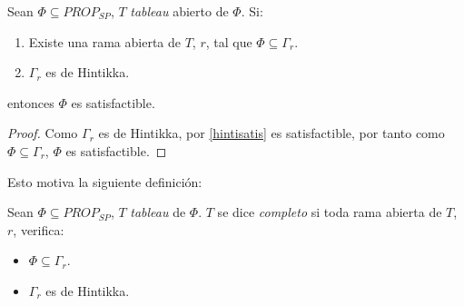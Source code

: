 \begin{cor}\label{hintitabli}
Sean $\Phi \subseteq PROP_{SP}$, $T$ \textit{tableau} abierto de $\Phi$. Si:
\begin{enumerate}
    \item Existe una rama abierta de $T$, $r$, tal que $\Phi \subseteq \Gamma_r$.
    \item $\Gamma_r$ es de Hintikka.
\end{enumerate}
entonces $\Phi$ es satisfactible.
\end{cor}

\begin{proof}
Como $\Gamma_r$ es de Hintikka, por \ref{hintisatis} es satisfactible, por tanto como $\Phi\subseteq\Gamma_r$, $\Phi$ es satisfactible.

\end{proof}



Esto motiva la siguiente definición:

\begin{definition}
Sean $\Phi \subseteq PROP_{SP}$, $T$ \textit{tableau} de $\Phi$. $T$ se dice \textit{completo} si toda rama abierta de $T$, $r$, verifica:
\begin{itemize}
    \item $\Phi \subseteq \Gamma_r$.
    \item $\Gamma_r$ es de Hintikka.
\end{itemize}
\end{definition}

